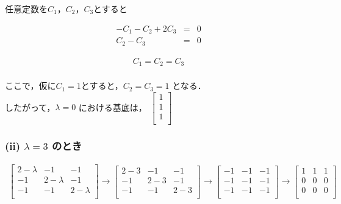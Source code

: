 \documentclass[a4paper]{jsarticle}
\begin{document}
任意定数を$C_1$，$C_2$，$C_3$とすると

\begin{eqnarray*}
	-C_1 -C_2 + 2C_3 &=& 0\\
	C_2 -C_3 &=& 0
\end{eqnarray*}

\begin{eqnarray*}
	C_1 = C_2 = C_3\\
\end{eqnarray*}

\noindent
ここで，仮に$C_1 = 1$とすると，$C_2 = C_3 = 1$ となる．\\

\noindent
したがって，$\lambda = 0$ における基底は，
\underline{$
		\begin{bmatrix}
			1 \\
			1 \\
			1 \\
		\end{bmatrix}
	$}

\subsubsection*{(ii) $\lambda = 3$ のとき}

\begin{eqnarray*}
	\begin{bmatrix}
		2-\lambda & -1        & -1        \\
		-1        & 2-\lambda & -1        \\
		-1        & -1        & 2-\lambda \\
	\end{bmatrix}
	\rightarrow
	\begin{bmatrix}
		2-3 & -1  & -1  \\
		-1  & 2-3 & -1  \\
		-1  & -1  & 2-3 \\
	\end{bmatrix}
	\rightarrow
	\begin{bmatrix}
		-1 & -1 & -1 \\
		-1 & -1 & -1 \\
		-1 & -1 & -1 \\
	\end{bmatrix}
	\rightarrow
	\begin{bmatrix}
		1 & 1 & 1 \\
		0 & 0 & 0 \\
		0 & 0 & 0 \\
	\end{bmatrix} \\
\end{eqnarray*}
\end{document}
